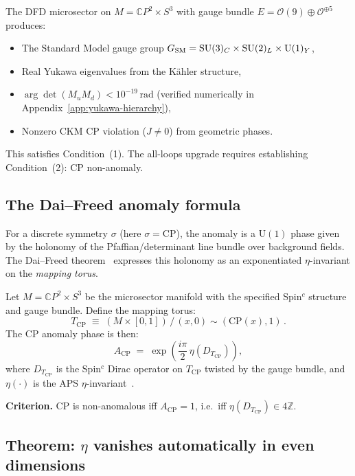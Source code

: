 The DFD microsector on $M = \mathbb{C}P^2\times S^3$ with gauge bundle $E = \mathcal{O}(9)\oplus\mathcal{O}^{\oplus 5}$ produces:
\begin{itemize}
\item The Standard Model gauge group $G_{\rm SM} = \mathrm{SU}(3)_C\times\mathrm{SU}(2)_L\times\mathrm{U}(1)_Y$,
\item Real Yukawa eigenvalues from the K\"ahler structure,
\item $\arg\det(M_u M_d) < 10^{-19}\,\mathrm{rad}$ (verified numerically in Appendix~\ref{app:yukawa-hierarchy}),
\item Nonzero CKM CP violation ($J \neq 0$) from geometric phases.
\end{itemize}
This satisfies Condition~(1). The all-loops upgrade requires establishing Condition~(2): CP non-anomaly.

\subsection{The Dai--Freed anomaly formula}

For a discrete symmetry $\sigma$ (here $\sigma=\mathrm{CP}$), the anomaly is a $\mathrm{U}(1)$ phase given by the holonomy of the Pfaffian/determinant line bundle over background fields.
The Dai--Freed theorem~\cite{DaiFreed1994,FreedMoore2013} expresses this holonomy as an exponentiated $\eta$-invariant on the \emph{mapping torus}.

Let $M = \mathbb{C}P^2\times S^3$ be the microsector manifold with the specified Spin$^c$ structure and gauge bundle.
Define the mapping torus:
\begin{equation}
T_{\mathrm{CP}}\;\equiv\;(M\times[0,1])\,/\,(x,0)\sim(\mathrm{CP}(x),1)\,.
\label{eq:L_mapping_torus}
\end{equation}
The CP anomaly phase is then:
\begin{equation}
A_{\mathrm{CP}}\;=\;\exp\!\left(\frac{i\pi}{2}\,\eta\!\left(D_{T_{\mathrm{CP}}}\right)\right),
\label{eq:L_anomaly_phase}
\end{equation}
where $D_{T_{\mathrm{CP}}}$ is the Spin$^c$ Dirac operator on $T_{\mathrm{CP}}$ twisted by the gauge bundle, and $\eta(\cdot)$ is the APS $\eta$-invariant~\cite{DaiFreed1994}.

\textbf{Criterion.} CP is non-anomalous iff $A_{\mathrm{CP}}=1$, i.e.\ iff $\eta(D_{T_{\mathrm{CP}}})\in 4\mathbb{Z}$.

\subsection{Theorem: $\eta$ vanishes automatically in even dimensions}

